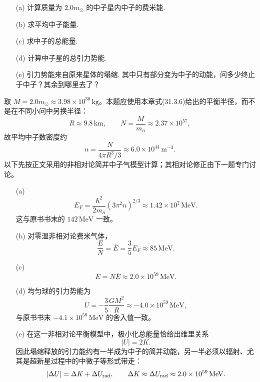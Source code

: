 \begin{exercise}\label{ex:31.3}
\begin{enumerate}
  \item[(a)] 计算质量为 $2.0 m_\odot$ 的中子星内中子的费米能. 
  \item[(b)] 求平均中子能量. 
  \item[(c)] 求中子的总能量. 
  \item[(d)] 计算中子星的总引力势能. 
  \item[(e)] 引力势能来自原来星体的塌缩. 其中只有部分变为中子的动能，问多少终止于中子？其余到哪里去了？
\end{enumerate}
\end{exercise}
\begin{solution}
取 $M=2.0m_\odot\approx3.98\times10^{30}\,\mathrm{kg}$。本题应使用本章式(31.3.6)给出的平衡半径，而不是在不同小问中另换半径：
\[
R\approx9.8\,\mathrm{km},\qquad
N=\frac{M}{m_n}\approx2.37\times10^{57},
\]
故平均中子数密度约
\[
n=\frac{N}{4\pi R^3/3}\approx6.0\times10^{44}\,\mathrm{m^{-3}}.
\]
以下先按正文采用的非相对论简并中子气模型计算；其相对论修正由下一题专门讨论。
\begin{enumerate}
\item[(a)]
\[
E_F=\frac{\hbar^2}{2m_n}(3\pi^2n)^{2/3}
\approx\boxed{1.42\times10^2\,\mathrm{MeV}}.
\]
这与原书书末的 $142\,\mathrm{MeV}$ 一致。

\item[(b)] 对零温非相对论费米气体，
\[
\boxed{\frac EN=\bar E=\frac35E_F\approx85\,\mathrm{MeV}}.
\]

\item[(c)]
\[
\boxed{E=N\bar E\approx2.0\times10^{59}\,\mathrm{MeV}}.
\]

\item[(d)] 均匀球的引力势能为
\[
U=-\frac35\frac{GM^2}{R}
\approx\boxed{-4.0\times10^{59}\,\mathrm{MeV}},
\]
与原书书末 $-4.1\times10^{59}\,\mathrm{MeV}$ 的舍入值一致。

\item[(e)] 在这一非相对论平衡模型中，极小化总能量恰给出维里关系
\[
|U|=2K.
\]
因此塌缩释放的引力能约有一半成为中子的简并动能，另一半必须以辐射、尤其是超新星过程中的中微子等形式带走：
\[
|\Delta U|=\Delta K+\Delta U_{\rm rad},\qquad
\Delta K\approx\Delta U_{\rm rad}\approx2.0\times10^{59}\,\mathrm{MeV}.
\]
\end{enumerate}
\end{solution}

